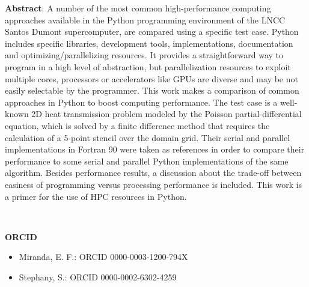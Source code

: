 \begin{itemize}
\textbf{Abstract}: A number of the most common high-performance computing approaches available in the Python programming environment of the LNCC Santos Dumont supercomputer, are compared using a specific test case. Python includes specific libraries, development tools, implementations, documentation and optimizing/parallelizing resources. It provides a straightforward way to program in a high level of abstraction, but parallelization resources to exploit multiple cores, processors or accelerators like GPUs are diverse and may be not easily selectable by the programmer. This work makes a comparison of common approaches in Python to boost computing performance. The test case is a well-known 2D heat transmission problem modeled by the Poisson partial-differential equation, which is solved by a finite difference method that requires the calculation of a 5-point stencil over the domain grid. Their serial and parallel implementations in Fortran 90 were taken as references in order to compare their performance to some serial and parallel Python implementations of the same algorithm. Besides performance results, a discussion about the trade-off between easiness of programming versus processing performance is included. This work is a primer for the use of HPC resources in Python. 

\end{itemize}

\

\textbf{ORCID}

\begin{itemize}

\item Miranda, E. F.: ORCID 0000-0003-1200-794X

\item Stephany, S.: ORCID 0000-0002-6302-4259

\end{itemize}


